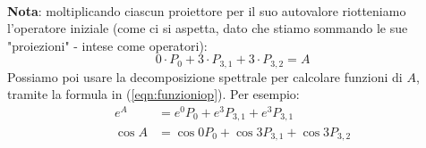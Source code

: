 \begin{enumerate}
\begin{align*}
	\end{align*}
\textbf{Nota}: moltiplicando ciascun proiettore per il suo autovalore riotteniamo l'operatore iniziale (come ci si aspetta, dato che stiamo sommando le sue "proiezioni" - intese come operatori):
\[
0\cdot P_0+3\cdot P_{3,1}+3\cdot P_{3,2}=A
\]
Possiamo poi usare la decomposizione spettrale per calcolare funzioni di $A$, tramite la formula in (\ref{eqn:funzioniop}). Per esempio:
\begin{align*}
    e^A&=e^0P_0+e^3P_{3,1}+e^3P_{3,1}\\
    \cos A &= \cos 0 P_0 + \cos 3 P_{3,1} + \cos 3 P_{3,2}
\end{align*}
\end{enumerate}

%